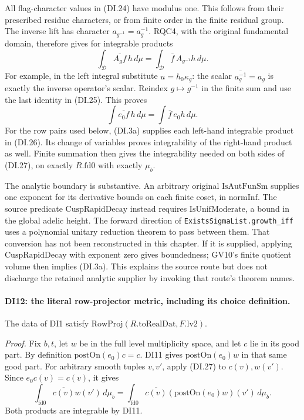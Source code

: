 All flag-character values in (DI.24) have modulus one. This follows
from their prescribed residue characters, or from finite order in
the finite residual group. The inverse lift has character
\(a_{g^{-1}}=a_g^{-1}\). RQC4, with the original fundamental
domain, therefore gives for integrable products
\[
 \int_{\mathcal D}\overline{A_gf}\,h\,d\mu
       =\int_{\mathcal D}\overline f\,A_{g^{-1}}h\,d\mu.
 \tag{DI.26}
\]
For example, in the left integral substitute \(u=h_0\kappa_g\):
the scalar \(\overline{a_g^{-1}}=a_g\) is exactly the inverse
operator's scalar. Reindex \(g\mapsto g^{-1}\) in the finite sum
and use the last identity in (DI.25). This proves
\[
         \int\overline{e_0f}\,h\,d\mu
                    =\int\overline f\,e_0h\,d\mu.
 \tag{DI.27}
\]
For the row pairs used below, (DI.3a) supplies each left-hand
integrable product in (DI.26). Its change of variables proves
integrability of the right-hand product as well. Finite summation
then gives the integrability needed on both sides of (DI.27),
on exactly \(R.\mathrm{fd0}\) with exactly \(\mu_b\).

The analytic boundary is substantive. An arbitrary original
\(\mathrm{IsAutFunSm}\) supplies one exponent for its derivative
bounds on each finite coset, in \(\mathrm{normInf}\). The
source predicate \(\mathrm{CuspRapidDecay}\) instead requires
\(\mathrm{IsUnifModerate}\), a bound in the global adelic height.
The forward direction of \texttt{ExistsSigmaList.growth\_iff}
uses a polynomial unitary reduction theorem to pass between them.
That conversion has not been reconstructed in this chapter. If it
is supplied, applying \(\mathrm{CuspRapidDecay}\) with exponent
zero gives boundedness; GV10's finite quotient volume then implies
(DI.3a). This explains the source route but does not discharge the
retained analytic supplier by invoking that route's theorem names.

\paragraph{DI12: the literal row-projector metric, including its choice definition.}
\label{claim:DI12}
The data of DI1 satisfy
\(\mathrm{RowProj}(R.\mathrm{toRealDat},F.\mathrm{lv2})\).

\emph{Proof.}
Fix \(b,t\), let \(w\) be in the full level multiplicity space,
and let \(c\) lie in its good part. By definition
\(\mathrm{postOn}(e_0)c=c\). DI11 gives
\(\mathrm{postOn}(e_0)w\) in that same good part. For arbitrary
smooth tuples \(v,v'\), apply (DI.27) to \(c(v),w(v')\). Since
\(e_0c(v)=c(v)\), it gives
\[
 \int_{\mathrm{fd0}}\overline{c(v)}w(v')\,d\mu_b
  =\int_{\mathrm{fd0}}\overline{c(v)}
                      (\mathrm{postOn}(e_0)w)(v')\,d\mu_b.
 \tag{DI.28}
\]
Both products are integrable by DI11.

